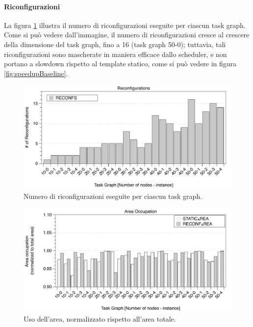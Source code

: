 \paragraph{Riconfigurazioni}
La figura \ref{fig:numeroRiconfigurazioni} illustra il numero di riconfigurazioni
eseguite per ciascun task graph. Come si pu\`o vedere dall'immagine, il numero
di riconfigurazioni cresce al crescere della dimensione del task graph,
fino a 16 (task graph 50-0); tuttavia, tali riconfigurazioni sono mascherate in maniera
efficace dallo scheduler, e non portano a slowdown rispetto al template statico,
come si pu\`o vedere in figura \ref{fig:speedupBaseline}.

\begin{figure}[t]
 \begin{center}
  \includegraphics[width=\textwidth]{./capitoli/figure/cap6/FPL_Reconfs.pdf}
  \caption{Numero di riconfigurazioni eseguite per ciascun task graph.}
  \label{fig:numeroRiconfigurazioni}
 \end{center}
\end{figure}



\begin{figure}[t]
 \begin{center}
  \includegraphics[width=\textwidth]{./capitoli/figure/cap6/FPL_Area.pdf}
  \caption{Uso dell'area, normalizzato rispetto all'area totale.}
  \label{fig:usoArea}
 \end{center}
\end{figure}

